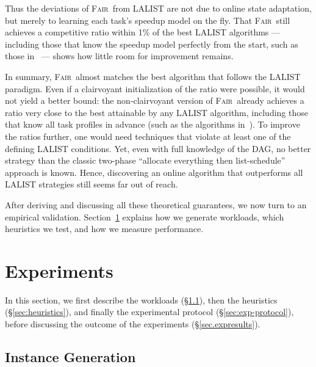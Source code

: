 \documentclass{article}
\newcommand\fair{\textsc{Fair}\xspace}
\begin{document}
Thus the deviations of \fair\ from \textsc{LALIST} are not due to online state adaptation, but merely to learning each task’s speedup model on the fly.  
That \fair\ still achieves a competitive ratio within 1\% of the best \textsc{LALIST} algorithms — including those that know the speedup model perfectly from the start, such as those in~\cite{ICPP22, TOPC24} — shows how little room for improvement remains.

In summary, \fair\ almost matches the best algorithm that follows the \textsc{LALIST} paradigm. Even if a clairvoyant initialization of the ratio were possible, it would not yield a better bound: the non‑clairvoyant version of \fair\ already achieves a ratio very close to the best attainable by any \textsc{LALIST} algorithm, including those that know all task profiles in advance (such as the algorithms in~\cite{ICPP22,TOPC24}). To improve the ratios further, one would need techniques that violate at least one of the defining \textsc{LALIST} conditions. Yet, even with full knowledge of the DAG, no better strategy than the classic two-phase “allocate everything then list-schedule” approach is known. Hence, discovering an online algorithm that outperforms all \textsc{LALIST} strategies still seems far out of reach.

After deriving and discussing all these theoretical guarantees, we now turn to an empirical validation. Section~\ref{sec.experiments} explains
how we generate workloads, which heuristics we test, and how we measure
performance.



\section{Experiments}
\label{sec.experiments}

In this section, we first describe the workloads (§\ref{sec:instance-gen}), then the
heuristics (§\ref{sec:heuristics}), and finally the experimental
protocol (§\ref{sec:exp-protocol}), before discussing the outcome of the experiments (§\ref{sec.expresults}).

\subsection{Instance Generation}
\label{sec:instance-gen}
\end{document}
